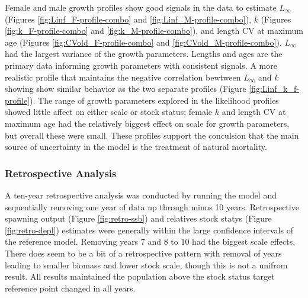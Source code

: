 \documentclass[11pt,
  english,
  a4paper,
]{article}
\begin{document}
\leavevmode\tagmcend\tagstructend\par


Female and male growth profiles show good signals in the data to estimate {\(L_{\infty}\)\leavevmode\tagmcend\tagstructend} (Figures \ref{fig:Linf_F-profile-combo} and \ref{fig:Linf_M-profile-combo}), {\(k\)\leavevmode\tagmcend\tagstructend} (Figures \ref{fig:k_F-profile-combo} and \ref{fig:k_M-profile-combo}), and length CV at maximum age (Figures \ref{fig:CVold_F-profile-combo} and \ref{fig:CVold_M-profile-combo}). {\(L_{\infty}\)\leavevmode\tagmcend\tagstructend} had the largest variance of the growth parameters. Lengths and ages are the primary data informing growth parameters with consistent signals. A more realistic profile that maintains the negative correlation bewtween {\(L_{\infty}\)\leavevmode\tagmcend\tagstructend} and {\(k\)\leavevmode\tagmcend\tagstructend} showing show similar behavior as the two separate profiles (Figure \ref{fig:Linf_k_f-profile}). The range of growth parameters explored in the likelihood profiles showed little affect on either scale or stock status; female {\(k\)\leavevmode\tagmcend\tagstructend} and length CV at maximum age had the relatively biggest effect on scale for growth parameters, but overall these were small. These profiles support the conculsion that the main source of uncertainty in the model is the treatment of natural mortality.

\leavevmode\tagmcend\tagstructend\par


\hypertarget{retrospective-analysis}{%
\subsubsection{Retrospective Analysis}\label{retrospective-analysis}}

\leavevmode\tagmcend\tagstructend


A ten-year retrospective analysis was conducted by running the model and sequentially removing one year of data up through minus 10 years. Retrospective spawning output (Figure \ref{fig:retro-ssb}) and relatives stock statys (Figure \ref{fig:retro-depl}) estimates were generally within the large confidence intervals of the reference model. Removing years 7 and 8 to 10 had the biggest scale effects. There does seem to be a bit of a retrospective pattern with removal of years leading to smaller biomass and lower stock scale, though this is not a unifrom result. All results maintained the population above the stock status target reference point changed in all years.
\end{document}
